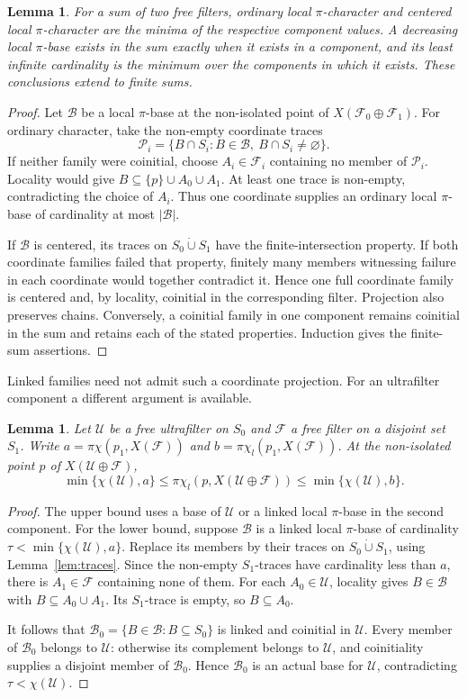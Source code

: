 \documentclass[10pt,a4paper]{amsart}
\newtheorem{lemma}[theorem]{Lemma}
\theoremstyle{definition}
\theoremstyle{remark}
\newcommand{\U}{\mathcal U}
\newcommand{\F}{\mathcal F}
\newcommand{\B}{\mathcal B}
\newcommand{\pc}{\pi\chi}
\newcommand{\pcl}{\pi\chi_l}
\begin{document}
\begin{lemma}\label{lem:sum}
For a sum of two free filters, ordinary local $\pi$-character and centered local $\pi$-character are the minima of the respective component values. A decreasing local $\pi$-base exists in the sum exactly when it exists in a component, and its least infinite cardinality is the minimum over the components in which it exists. These conclusions extend to finite sums.
\end{lemma}
\begin{proof}
Let $\B$ be a local $\pi$-base at the non-isolated point of $X(\F_0\oplus\F_1)$. For ordinary character, take the non-empty coordinate traces
\[
\mathcal P_i=\{B\cap S_i:B\in\B,\ B\cap S_i\ne\varnothing\}.
\]
If neither family were coinitial, choose $A_i\in\F_i$ containing no member of $\mathcal P_i$. Locality would give $B\subseteq\{p\}\cup A_0\cup A_1$. At least one trace is non-empty, contradicting the choice of $A_i$. Thus one coordinate supplies an ordinary local $\pi$-base of cardinality at most $|\B|$.

If $\B$ is centered, its traces on $S_0\mathbin{\dot\cup}S_1$ have the finite-intersection property. If both coordinate families failed that property, finitely many members witnessing failure in each coordinate would together contradict it. Hence one full coordinate family is centered and, by locality, coinitial in the corresponding filter. Projection also preserves chains. Conversely, a coinitial family in one component remains coinitial in the sum and retains each of the stated properties. Induction gives the finite-sum assertions.
\end{proof}

Linked families need not admit such a coordinate projection. For an ultrafilter component a different argument is available.

\begin{lemma}\label{lem:ultra-linked}
Let $\U$ be a free ultrafilter on $S_0$ and $\F$ a free filter on a disjoint set $S_1$. Write $a=\pc(p_1,X(\F))$ and $b=\pcl(p_1,X(\F))$. At the non-isolated point $p$ of $X(\U\oplus\F)$,
\[
\min\{\chi(\U),a\}\leqslant\pcl(p,X(\U\oplus\F))
\leqslant\min\{\chi(\U),b\}.
\]
\end{lemma}
\begin{proof}
The upper bound uses a base of $\U$ or a linked local $\pi$-base in the second component. For the lower bound, suppose $\B$ is a linked local $\pi$-base of cardinality $\tau<\min\{\chi(\U),a\}$. Replace its members by their traces on $S_0\mathbin{\dot\cup}S_1$, using Lemma~\ref{lem:traces}. Since the non-empty $S_1$-traces have cardinality less than $a$, there is $A_1\in\F$ containing none of them. For each $A_0\in\U$, locality gives $B\in\B$ with $B\subseteq A_0\cup A_1$. Its $S_1$-trace is empty, so $B\subseteq A_0$.

It follows that $\B_0=\{B\in\B:B\subseteq S_0\}$ is linked and coinitial in $\U$. Every member of $\B_0$ belongs to $\U$: otherwise its complement belongs to $\U$, and coinitiality supplies a disjoint member of $\B_0$. Hence $\B_0$ is an actual base for $\U$, contradicting $\tau<\chi(\U)$.
\end{proof}
\end{document}
